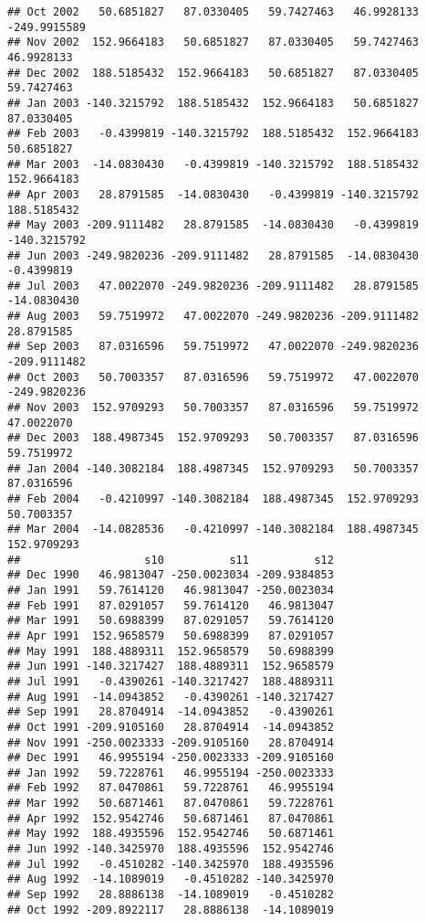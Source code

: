 \documentclass[]{article}
\begin{document}
\begin{verbatim}
## Oct 2002   50.6851827   87.0330405   59.7427463   46.9928133 -249.9915589
## Nov 2002  152.9664183   50.6851827   87.0330405   59.7427463   46.9928133
## Dec 2002  188.5185432  152.9664183   50.6851827   87.0330405   59.7427463
## Jan 2003 -140.3215792  188.5185432  152.9664183   50.6851827   87.0330405
## Feb 2003   -0.4399819 -140.3215792  188.5185432  152.9664183   50.6851827
## Mar 2003  -14.0830430   -0.4399819 -140.3215792  188.5185432  152.9664183
## Apr 2003   28.8791585  -14.0830430   -0.4399819 -140.3215792  188.5185432
## May 2003 -209.9111482   28.8791585  -14.0830430   -0.4399819 -140.3215792
## Jun 2003 -249.9820236 -209.9111482   28.8791585  -14.0830430   -0.4399819
## Jul 2003   47.0022070 -249.9820236 -209.9111482   28.8791585  -14.0830430
## Aug 2003   59.7519972   47.0022070 -249.9820236 -209.9111482   28.8791585
## Sep 2003   87.0316596   59.7519972   47.0022070 -249.9820236 -209.9111482
## Oct 2003   50.7003357   87.0316596   59.7519972   47.0022070 -249.9820236
## Nov 2003  152.9709293   50.7003357   87.0316596   59.7519972   47.0022070
## Dec 2003  188.4987345  152.9709293   50.7003357   87.0316596   59.7519972
## Jan 2004 -140.3082184  188.4987345  152.9709293   50.7003357   87.0316596
## Feb 2004   -0.4210997 -140.3082184  188.4987345  152.9709293   50.7003357
## Mar 2004  -14.0828536   -0.4210997 -140.3082184  188.4987345  152.9709293
##                   s10          s11          s12
## Dec 1990   46.9813047 -250.0023034 -209.9384853
## Jan 1991   59.7614120   46.9813047 -250.0023034
## Feb 1991   87.0291057   59.7614120   46.9813047
## Mar 1991   50.6988399   87.0291057   59.7614120
## Apr 1991  152.9658579   50.6988399   87.0291057
## May 1991  188.4889311  152.9658579   50.6988399
## Jun 1991 -140.3217427  188.4889311  152.9658579
## Jul 1991   -0.4390261 -140.3217427  188.4889311
## Aug 1991  -14.0943852   -0.4390261 -140.3217427
## Sep 1991   28.8704914  -14.0943852   -0.4390261
## Oct 1991 -209.9105160   28.8704914  -14.0943852
## Nov 1991 -250.0023333 -209.9105160   28.8704914
## Dec 1991   46.9955194 -250.0023333 -209.9105160
## Jan 1992   59.7228761   46.9955194 -250.0023333
## Feb 1992   87.0470861   59.7228761   46.9955194
## Mar 1992   50.6871461   87.0470861   59.7228761
## Apr 1992  152.9542746   50.6871461   87.0470861
## May 1992  188.4935596  152.9542746   50.6871461
## Jun 1992 -140.3425970  188.4935596  152.9542746
## Jul 1992   -0.4510282 -140.3425970  188.4935596
## Aug 1992  -14.1089019   -0.4510282 -140.3425970
## Sep 1992   28.8886138  -14.1089019   -0.4510282
## Oct 1992 -209.8922117   28.8886138  -14.1089019

\end{verbatim}
\end{document}
